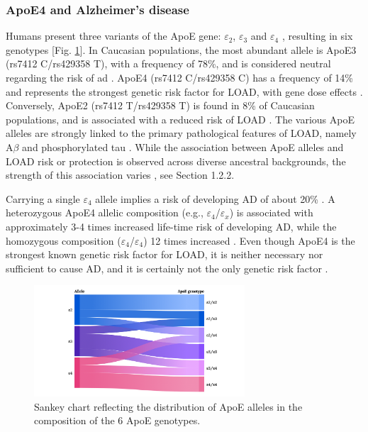 \documentclass{amsart}
\begin{document}
\subsubsection*{ApoE4 and Alzheimer's disease}
Humans present three variants of the ApoE gene: $\varepsilon_2$, $\varepsilon_3$ and $\varepsilon_4$ \cite{Husain2021APOETherapeutics, Yang2023ApolipoproteinDisease}, resulting in six genotypes [Fig. \ref{fig1}]. In Caucasian populations, the most abundant allele is ApoE3 (rs7412 C/rs429358 T), with a frequency of 78\%, and is considered neutral regarding the risk of \acrshort{ad} \cite{Liu2013ApolipoproteinTherapy}. ApoE4 (rs7412 C/rs429358 C) has a frequency of 14\% and represents the strongest genetic risk factor for LOAD, with gene dose effects \cite{Strittmatter1993ApolipoproteinDisease}. Conversely, ApoE2 (rs7412 T/rs429358 T) is found in 8\% of Caucasian populations, and is associated with a reduced risk of LOAD \cite{Liu2013ApolipoproteinTherapy}. The various ApoE alleles are strongly linked to the primary pathological features of LOAD, namely A$\beta$ and phosphorylated tau \cite{Deming2017Genome-wideModifiers}. While the association between ApoE alleles and LOAD risk or protection is observed across diverse ancestral backgrounds, the strength of this association varies \cite{Belloy2019AForward, Farrer1997EffectsMeta-analysis}, see Section 1.2.2.

Carrying a single $\varepsilon_4$ allele implies a risk of developing AD of about 20\% \cite{Bookheimer2009APOE4GA}. A heterozygous ApoE4 allelic composition (e.g., $\varepsilon_4$/$\varepsilon_x$) is associated with approximately 3-4 times increased life-time risk of developing AD, while the homozygous composition ($\varepsilon_4$/$\varepsilon_4$) 12 times increased \cite{Kim2009TheRO}. Even though ApoE4 is the strongest known genetic risk factor for LOAD, it is neither necessary nor sufficient to cause AD, and it is certainly not the only genetic risk factor \cite{SerranoPozo2019IsAD}.

\begin{figure}[H]
  \includegraphics[width=0.7\textwidth]{figures/ApoE@2x.png}
    \caption{Sankey chart reflecting the distribution of ApoE alleles in the composition of the 6 ApoE genotypes.}
  \label{fig1}
\end{figure}
\end{document}
